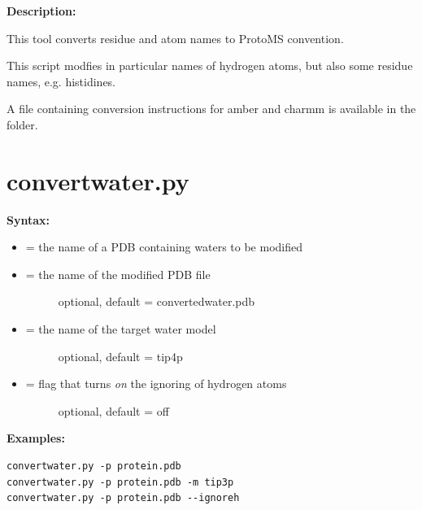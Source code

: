 \documentclass[letterpaper,10pt,english]{manual}
\begin{document}
\textbf{Description:}

This tool converts residue and atom names to ProtoMS convention.

This script modfies in particular names of hydrogen atoms, but also some residue names, e.g. histidines.

A file containing conversion instructions for amber and charmm is available in the  folder.


\section{convertwater.py}

\textbf{Syntax:}

\begin{itemize}
\item {} 
 = the name of a PDB containing waters to be modified

\item {} \begin{description}
\item[{ = the name of the modified PDB file}] \leavevmode
optional, default = convertedwater.pdb

\end{description}

\item {} \begin{description}
\item[{ = the name of the target water model}] \leavevmode
optional, default = tip4p

\end{description}

\item {} \begin{description}
\item[{ = flag that turns \emph{on} the ignoring of hydrogen atoms}] \leavevmode
optional, default = off

\end{description}

\end{itemize}

\textbf{Examples:}

\begin{Verbatim}[commandchars=@\[\]]
convertwater.py -p protein.pdb
convertwater.py -p protein.pdb -m tip3p
convertwater.py -p protein.pdb --ignoreh
\end{Verbatim}
\end{document}
